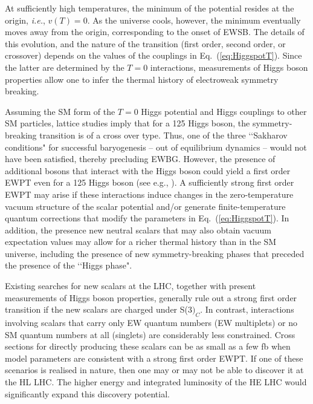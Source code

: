 At sufficiently high temperatures, the minimum of the potential resides at the origin, {\it i.e.}, $v(T) = 0$. As the universe cools, however, the minimum eventually moves away from the origin, corresponding to the onset of EWSB. The details of this evolution, and the nature of the transition (first order, second order, or crossover) depends on the values of the couplings in Eq.~(\ref{eq:HiggspotT}). Since the latter are determined by the $T=0$ interactions, measurements of Higgs boson properties allow one to infer the thermal history of electroweak symmetry breaking. 

Assuming the SM form of the $T=0$ Higgs potential and Higgs couplings to other SM particles, lattice studies imply that for a 125 \UGeV Higgs boson, the symmetry-breaking transition is of a cross over type\cite{Rummukainen:1998as,Csikor:1998eu,Laine:1998jb,Gurtler:1997hr}. Thus, one of the three \lq\lq Sakharov conditions" for successful baryogenesis\cite{Sakharov:1967dj} -- out of equilibrium dynamics -- would not have been satisfied, thereby precluding EWBG. However, the presence of additional bosons that interact with the Higgs boson could yield a first order EWPT even for a 125 \UGeV Higgs boson (see e.g., \cite{Morrissey:2012db,Assamagan:2016azc}). A sufficiently strong first order EWPT may arise if these interactions induce changes in the zero-temperature vacuum structure of the scalar potential and/or generate finite-temperature quantum corrections that modify the parameters in Eq.~(\eqref{eq:HiggspotT}). In addition, the presence new neutral scalars that may also obtain vacuum expectation values may allow for a richer thermal history than in the SM universe, including the presence of new symmetry-breaking phases that preceded the presence of the \lq\lq Higgs phase"\cite{Patel:2012pi,Patel:2013zla,Blinov:2015sna}. 

 Existing searches for new scalars at the LHC, together with present measurements of Higgs boson properties, generally rule out a strong first order transition if the new scalars are charged under S(3$)_C$\cite{Katz:2014bha,Katz:2015uja}. In contrast, interactions involving scalars that carry only EW quantum numbers (EW multiplets) or no SM quantum numbers at all (singlets) are considerably less constrained. Cross sections for directly producing these scalars can be as small as a few fb when model parameters are consistent with a strong first order EWPT. If one of these scenarios is realised in nature, then one may or may not be able to discover it at the HL LHC. The higher energy and integrated luminosity of the HE LHC would significantly expand this discovery potential. 

